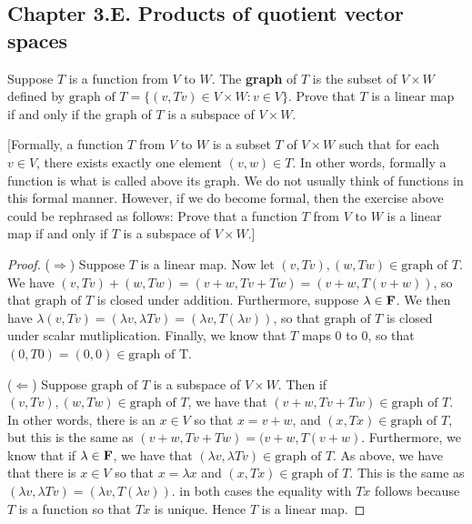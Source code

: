 \subsection*{Chapter 3.E. Products of quotient vector spaces}


\begin{exercise}{1}
  Suppose $T$ is a function from $V$ to $W$. The \textbf{graph} of $T$ is the subset of $V\times W$ defined by $\text{graph of }T=\{(v,Tv)\in V\times W:v\in V\}$. Prove that $T$ is a linear map if and only if the graph of $T$ is a subspace of $V\times W$. 
  
  [Formally, a function $T$ from $V$ to $W$ is a subset $T$ of $V\times W$ such that for each $v\in V$, there exists exactly one element $(v,w)\in T$. In other words, formally a function is what is called above its graph. We do not usually think of functions in this formal manner. However, if we do become formal, then the exercise above could be rephrased as follows: Prove that a function $T$ from $V$ to $W$ is a linear map if and only if $T$ is a subspace of $V\times W$.]
\end{exercise}
\begin{proof}
 ($\Rightarrow$) Suppose $T$ is a linear map. Now let $(v,Tv),(w,Tw)\in\text{graph of }T$. We have $(v,Tv)+(w,Tw)= (v+w, Tv+Tw)= (v+w, T(v+w))$, so that $\text{graph of }T$ is closed under addition. Furthermore, suppose $\lambda\in\mathbf{F}$. We then have $\lambda(v,Tv)= (\lambda v, \lambda Tv)= (\lambda v, T(\lambda v))$, so that $\text{graph of }T$ is closed under scalar mutliplication. Finally, we know that $T$ maps $0$ to $0$, so that $(0, T0)=(0,0)\in\text{graph of T}$.

 ($\Leftarrow$) Suppose $\text{graph of }T$ is a subspace of $V\times W$. Then if $(v,Tv),(w,Tw)\in\text{graph of }T$, we have that $(v+w,Tv+Tw)\in\text{graph of }T$. In other words, there is an $x\in V$ so that $x=v+w$, and $(x,Tx)\in\text{graph of }T$, but this is the same as $(v+w, Tv+Tw)=(v+w, T(v+w)$. Furthermore, we know that if $\lambda\in\mathbf{F}$, we have that $(\lambda v, \lambda Tv)\in\text{graph of }T$. As above, we have that there is $x\in V$ so that $x=\lambda x$ and $(x,Tx)\in\text{graph of }T$. This is the same as $(\lambda v, \lambda Tv)=(\lambda v, T(\lambda v))$. in both cases the equality with $Tx$ follows because $T$ is a function so that $Tx$ is unique. Hence $T$ is a linear map.
\end{proof}

